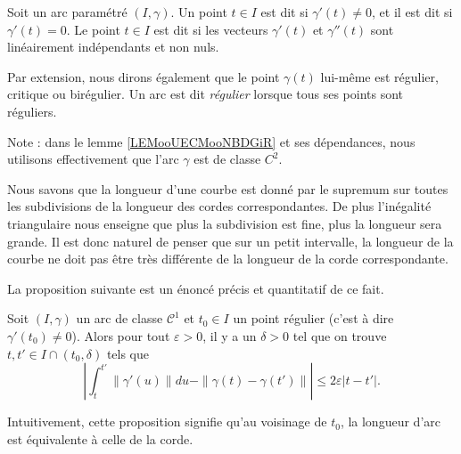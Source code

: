 \begin{definition}
    Soit un arc paramétré $(I,\gamma)$. Un point $t\in I$ est dit  si $\gamma'(t)\neq 0$, et il est dit  si $\gamma'(t)=0$. Le point $t\in I$ est dit  si les vecteurs $\gamma'(t)$ et $\gamma''(t)$ sont linéairement indépendants et non nuls. 
    
    Par extension, nous dirons également que le point $\gamma(t)$ lui-même est régulier, critique ou birégulier. Un arc est dit \emph{régulier} lorsque tous ses points sont réguliers.
\end{definition}
Note : dans le lemme \ref{LEMooUECMooNBDGiR} et ses dépendances, nous utilisons effectivement que l'arc \( \gamma\) est de classe \( C^2\).

Nous savons que la longueur d'une courbe est donné par le supremum sur toutes les subdivisions de la longueur des cordes correspondantes. De plus l'inégalité triangulaire nous enseigne que plus la subdivision est fine, plus la longueur sera grande. Il est donc naturel de penser que sur un petit intervalle, la longueur de la courbe ne doit pas être très différente de la longueur de la corde correspondante. 

La proposition suivante est un énoncé précis et quantitatif de ce fait.
\begin{proposition}
    Soit $(I,\gamma)$ un arc de classe $\mathcal{C}^1$ et $t_0\in I$ un point régulier (c'est à dire $\gamma'(t_0)\neq 0$). Alors pour tout $\varepsilon>0$, il y a un $\delta>0$ tel que on trouve  $t,t'\in I\cap(t_0,\delta)$ tels que
    \begin{equation}
        \left| \int_t^{t'}\| \gamma'(u) \|du-\| \gamma(t)-\gamma(t') \| \right| \leq 2\varepsilon| t-t' |.
    \end{equation}
\end{proposition}
Intuitivement, cette proposition signifie qu'au voisinage de $t_0$, la longueur d'arc est équivalente à celle de la corde. 

